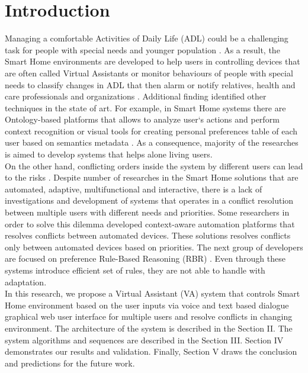 \documentclass{llncs}
\begin{document}
    \section{Introduction}
    Managing a comfortable Activities of Daily Life (ADL) could be a challenging task for people with special needs
    and younger population \cite{9}.
    As a result,
    the Smart Home environments are developed to help users in controlling devices \cite{13}
    that are often called Virtual Assistants \cite{9} or monitor behaviours of people
    with special needs \cite{3} to classify changes in ADL that then alarm or notify relatives, health and care professionals
    and organizations \cite{15}.
    Additional finding identified other techniques in the state of art.
    For example, in Smart Home systems there are Ontology-based platforms that allows to analyze user`s actions and
    perform context recognition \cite{1} or visual tools for creating personal preferences table of each user based on semantics
    metadata \cite{8}.
    As a consequence, majority of the researches is aimed to develop systems that helps alone living users.\\
    On the other hand, conflicting orders inside the system by different users can lead to the risks \cite{5}.
    Despite number of
    researches in the Smart Home solutions that are automated, adaptive, multifunctional and interactive, there is a lack of
    investigations and development of systems that operates in a conflict resolution between multiple users with different
    needs and priorities.
    Some researchers in order to solve this dilemma developed context-aware automation platforms
    \cite{5,6} that resolves conflicts between automated devices.
    These solutions resolves conflicts only between automated devices based on priorities.
    The next group of
    developers are focused on preference Rule-Based Reasoning (RBR) \cite{9}.
    Even through
    these systems introduce efficient set of rules, they are not able to handle with adaptation. \\
    In this research, we propose a Virtual Assistant (VA) system that controls Smart Home environment based on the user inputs via
    voice and text based dialogue graphical web user interface for multiple users and resolve conflicts in changing environment.
    The architecture of the system is
    described in the Section II. The system algorithms and sequences are described in the Section III. Section IV demonstrates
    our results and validation.
    Finally, Section V draws the conclusion and predictions for the future work.
\end{document}
